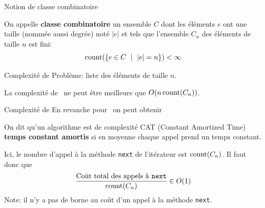 \documentclass{beamer}
\begin{document}
\begin{frame}{Notion de classe combinatoire}
  \begin{DEFN}
    On appelle \textbf{classe combinatoire} un ensemble $C$ dont les éléments
    $e$ ont une taille (nommée aussi degrée) noté $|e|$ et tels que l'ensemble
    $C_n$ des éléments de taille $n$ est fini:
    \[
    \operatorname{count}(\{e\in C\ \mid\ |e| = n\}) < \infty
    \]
  \end{DEFN}
\end{frame}

\begin{frame}{Complexité de \List}
  Problème: liste des éléments de taille $n$.
  \pause
  \begin{PROP}
    La complexité de \List\ ne peut être meilleure que $O(n\operatorname{count}(C_n))$.
  \end{PROP}
\end{frame}

\begin{frame}{Complexité de \Iter}
  En revanche pour \Iter\ on peut obtenir
  \medskip

  \begin{DEFN}
    On dit qu'un algorithme est de complexité CAT (Constant Amortized Time)
    \textbf{temps constant amortis} si en moyenne chaque appel prend un temps
    constant.
  \end{DEFN}
  \bigskip\pause
  Ici, le nombre d'appel à la méthode \texttt{next} de l'itérateur est
  $\operatorname{count}(C_n)$. Il faut donc que
  $$\frac{\text{Coût total des appels à
      \texttt{next}}}{\operatorname{count}(C_n)}\in O(1)$$
  \bigskip\pause
  Note: il n'y a pas de borne au coût d'un appel à la méthode \texttt{next}.
\end{frame}
\end{document}

